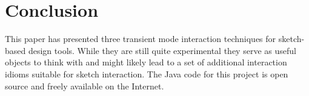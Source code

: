 \documentclass{egpubl}
\begin{document}
\section{Conclusion}

This paper has presented three transient mode interaction techniques
for sketch-based design tools. While they are still quite experimental
they serve as useful objects to think with and might likely lead to a
set of additional interaction idioms suitable for sketch
interaction. The Java code for this project is open source and freely
available on the Internet.





\end{document}
